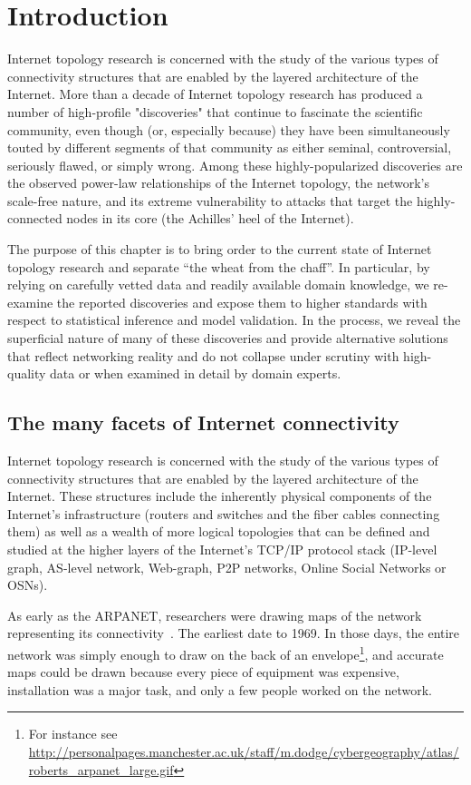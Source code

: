 \section{Introduction}

Internet topology research is concerned with the study of the various
types of connectivity structures that are enabled by the layered
architecture of the Internet. More than a decade of Internet topology
research has produced a number of high-profile "discoveries" that
continue to fascinate the scientific community, even though (or,
especially because) they have been simultaneously touted by different
segments of that community as either seminal, controversial, seriously
flawed, or simply wrong.  Among these highly-popularized discoveries
are the observed power-law relationships of the Internet topology, the
network's scale-free nature, and its extreme vulnerability to attacks
that target the highly-connected nodes in its core (\ie the
Achilles' heel of the Internet).

The purpose of this chapter is to bring order to the current state of
Internet topology research and separate ``the wheat from the chaff''.
In particular, by relying on carefully vetted data and readily
available domain knowledge, we re-examine the reported discoveries and
expose them to higher standards with respect to statistical inference
and model validation.  In the process, we reveal the superficial
nature of many of these discoveries and provide alternative solutions
that reflect networking reality and do not collapse under scrutiny
with high-quality data or when examined in detail by domain experts.

\subsection{The many facets of Internet connectivity}

Internet topology research is concerned with the study of the various
types of connectivity structures that are enabled by the layered
architecture of the Internet.  These structures include the inherently
physical components of the Internet's infrastructure (\eg routers
and switches and the fiber cables connecting them) as well as a wealth
of more logical topologies that can be defined and studied at the
higher layers of the Internet's TCP/IP protocol stack (\eg IP-level
graph, AS-level network, Web-graph, P2P networks, Online Social
Networks or OSNs).


As early as the ARPANET, researchers were drawing maps
of the network representing its
connectivity~\cite{cerf90:_selected_maps}.  The earliest date to
1969. In those days, the entire network was simply enough to draw on
the back of an envelope\footnote{For instance see
  \url{http://personalpages.manchester.ac.uk/staff/m.dodge/cybergeography/atlas/roberts_arpanet_large.gif}},
and accurate maps could be drawn because every piece of equipment was
expensive, installation was a major task, and only a few people worked
on the network.

